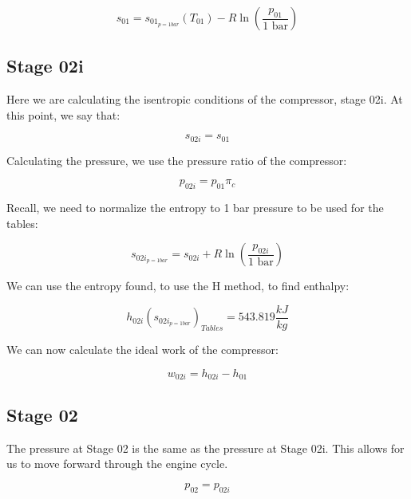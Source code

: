 \documentclass[titlepage]{article}
\begin{document}
    \begin{equation}
        s_{01} = s_{01_{p=1 bar}}(T_{01}) - R \ln \left( \frac{p_{01}}{1 \text{ bar}} \right)
    \end{equation}

    \subsection{Stage 02i}

    Here we are calculating the isentropic conditions of the compressor, stage 02i. At this point, we say that:

    \begin{equation}
        s_{02i} = s_{01}
    \end{equation}

    Calculating the pressure, we use the pressure ratio of the compressor:

    \begin{equation}
        p_{02i} = p_{01} \pi_{c}
    \end{equation}

    Recall, we need to normalize the entropy to 1 bar pressure to be used for the tables:

    \begin{equation}
        s_{02i_{p=1 bar}} =  s_{02i}+ R \ln \left( \frac{p_{02i}}{1 \text{ bar}} \right)
    \end{equation}

    We can use the entropy found, to use the H method, to find enthalpy:

    \begin{equation}
        h_{02i}(s_{02i_{p=1 bar}})_{Tables} =  543.819 \frac{kJ}{kg}
    \end{equation}

    We can now calculate the ideal work of the compressor:

    \begin{equation}
        w_{02i} = h_{02i} - h_{01}
    \end{equation}


    \subsection{Stage 02}

    The pressure at Stage 02 is the same as the pressure at Stage 02i. This allows for us to move forward through the engine cycle.

    \begin{equation}
        p_{02} = p_{02i}
    \end{equation}
\end{document}
